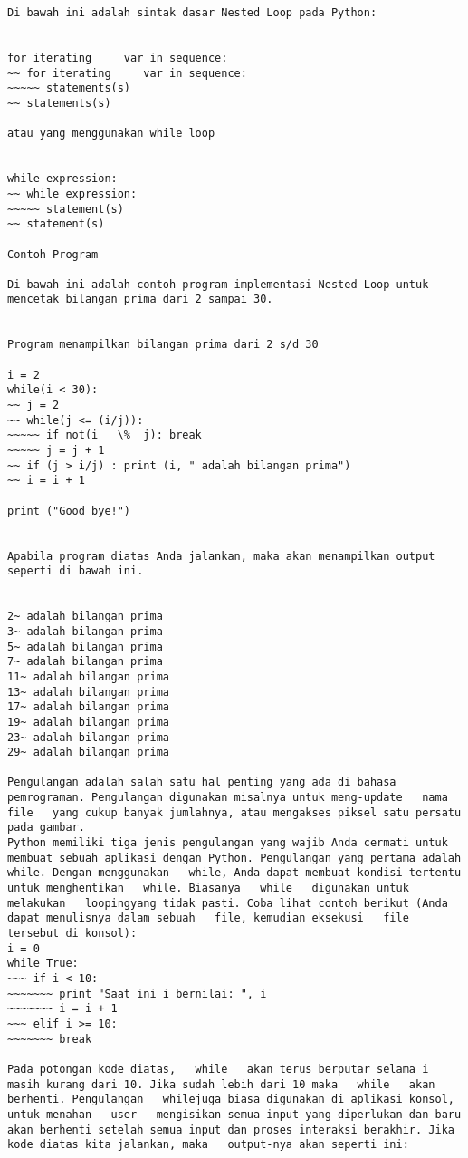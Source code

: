 \begin{verbatim}
Di bawah ini adalah sintak dasar Nested Loop pada Python:

 
for iterating     var in sequence: 
~~ for iterating     var in sequence: 
~~~~~ statements(s) 
~~ statements(s) 

atau yang menggunakan while loop

 
while expression: 
~~ while expression: 
~~~~~ statement(s) 
~~ statement(s) 

Contoh Program

Di bawah ini adalah contoh program implementasi Nested Loop untuk mencetak bilangan prima dari 2 sampai 30.

 
Program menampilkan bilangan prima dari 2 s/d 30 

i = 2 
while(i < 30): 
~~ j = 2 
~~ while(j <= (i/j)): 
~~~~~ if not(i   \%  j): break 
~~~~~ j = j + 1 
~~ if (j > i/j) : print (i, " adalah bilangan prima") 
~~ i = i + 1 

print ("Good bye!") 


Apabila program diatas Anda jalankan, maka akan menampilkan output seperti di bawah ini.

 
2~ adalah bilangan prima 
3~ adalah bilangan prima 
5~ adalah bilangan prima 
7~ adalah bilangan prima 
11~ adalah bilangan prima 
13~ adalah bilangan prima 
17~ adalah bilangan prima 
19~ adalah bilangan prima 
23~ adalah bilangan prima 
29~ adalah bilangan prima 

Pengulangan adalah salah satu hal penting yang ada di bahasa pemrograman. Pengulangan digunakan misalnya untuk meng-update   nama   file   yang cukup banyak jumlahnya, atau mengakses piksel satu persatu pada gambar. 
Python memiliki tiga jenis pengulangan yang wajib Anda cermati untuk membuat sebuah aplikasi dengan Python. Pengulangan yang pertama adalah   while. Dengan menggunakan   while, Anda dapat membuat kondisi tertentu untuk menghentikan   while. Biasanya   while   digunakan untuk melakukan   loopingyang tidak pasti. Coba lihat contoh berikut (Anda dapat menulisnya dalam sebuah   file, kemudian eksekusi   file   tersebut di konsol): 
i = 0 
while True: 
~~~ if i < 10: 
~~~~~~~ print "Saat ini i bernilai: ", i 
~~~~~~~ i = i + 1 
~~~ elif i >= 10: 
~~~~~~~ break 

Pada potongan kode diatas,   while   akan terus berputar selama i masih kurang dari 10. Jika sudah lebih dari 10 maka   while   akan berhenti. Pengulangan   whilejuga biasa digunakan di aplikasi konsol, untuk menahan   user   mengisikan semua input yang diperlukan dan baru akan berhenti setelah semua input dan proses interaksi berakhir. Jika kode diatas kita jalankan, maka   output-nya akan seperti ini: 


\end{verbatim}
